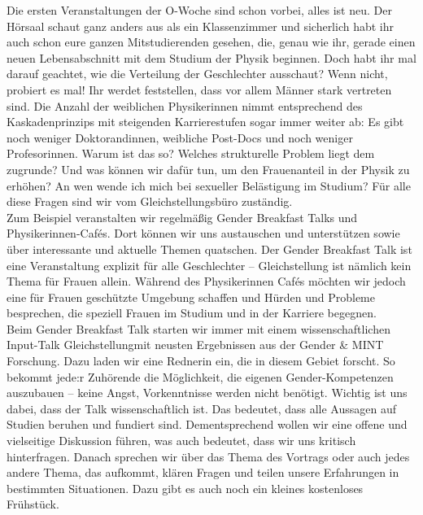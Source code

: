 \begin{multicols}{2}
Die ersten Veranstaltungen der O-Woche sind schon vorbei, alles ist neu. Der Hörsaal schaut ganz anders aus als ein Klassenzimmer und sicherlich habt ihr auch schon eure ganzen Mitstudierenden gesehen, die, genau wie ihr, gerade einen neuen Lebensabschnitt mit dem Studium der Physik beginnen. Doch habt ihr mal darauf geachtet, wie die Verteilung der Geschlechter ausschaut? Wenn nicht, probiert es mal! Ihr werdet feststellen, dass vor allem Männer stark vertreten sind. Die Anzahl der weiblichen Physikerinnen nimmt entsprechend des Kaskadenprinzips mit steigenden Karrierestufen sogar immer weiter ab: Es gibt noch weniger Doktorandinnen, weibliche Post-Docs und noch weniger Profesorinnen. Warum ist das so? Welches strukturelle Problem liegt dem zugrunde? Und was können wir dafür tun, um den Frauenanteil in der Physik zu erhöhen? An wen wende ich mich bei sexueller Belästigung im Studium? Für alle diese Fragen sind wir vom Gleichstellungsbüro zuständig. \\

Zum Beispiel veranstalten wir regelmäßig Gender Breakfast Talks und Physikerinnen-Cafés. Dort können wir uns austauschen und unterstützen sowie über interessante und aktuelle Themen quatschen. Der Gender Breakfast Talk ist eine Veranstaltung explizit für alle Geschlechter – Gleichstellung ist nämlich kein Thema für Frauen allein. Während des Physikerinnen Cafés möchten wir jedoch eine für Frauen geschützte Umgebung schaffen und Hürden und Probleme besprechen, die speziell Frauen im Studium und in der Karriere begegnen. \\

Beim Gender Breakfast Talk starten wir immer mit einem wissenschaftlichen Input-Talk Gleichstellungmit neusten Ergebnissen aus der Gender & MINT Forschung. Dazu laden wir eine Rednerin ein, die in diesem Gebiet forscht. So bekommt jede:r Zuhörende die Möglichkeit, die eigenen Gender-Kompetenzen auszubauen – keine Angst, Vorkenntnisse werden nicht benötigt. Wichtig ist uns dabei, dass der Talk wissenschaftlich ist. Das bedeutet, dass alle Aussagen auf Studien beruhen und fundiert sind. Dementsprechend wollen wir eine offene und vielseitige Diskussion führen, was auch bedeutet, dass wir uns kritisch hinterfragen. Danach sprechen wir über das Thema des Vortrags oder auch jedes andere Thema, das aufkommt, klären Fragen und teilen unsere Erfahrungen in bestimmten Situationen. Dazu gibt es auch noch ein kleines kostenloses Frühstück. \\


\end{multicols}
